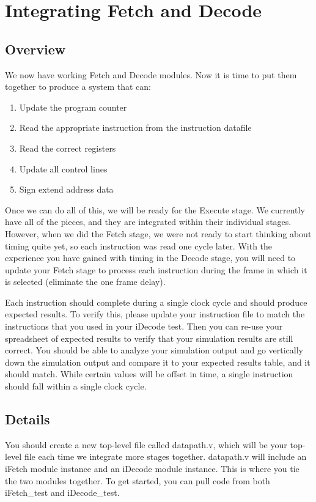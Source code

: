 \chapter{Integrating Fetch and Decode}

\section{Overview}
We now have working Fetch and Decode modules.  Now it is time to put them together to produce a system that can:
\begin{enumerate}
	\item Update the program counter
	\item Read the appropriate instruction from the instruction datafile
	\item Read the correct registers
	\item Update all control lines
	\item Sign extend address data
\end{enumerate}

Once we can do all of this, we will be ready for the Execute stage.  We currently have all of the pieces, and they are integrated within their individual stages.  However, when we did the Fetch stage, we were not ready to start thinking about timing quite yet, so each instruction was read one cycle later.  With the experience you have gained with timing in the Decode stage, you will need to update your Fetch stage to process each instruction during the frame in which it is selected (eliminate the one frame delay).  

Each instruction should complete during a single clock cycle and should produce expected results.  To verify this, please update your instruction file to match the instructions that you used in your iDecode test.  Then you can re-use your spreadsheet of expected results to verify that your simulation results are still correct.  You should be able to analyze your simulation output and go vertically down the simulation output and compare it to your expected results table, and it should match.  While certain values will be offset in time, a single instruction should fall within a single clock cycle.  

\section{Details}
You should create a new top-level file called datapath.v, which will be your top-level file each time we integrate more stages together.  datapath.v will include an iFetch module instance and an iDecode module instance.  This is where you tie the two modules together.  To get started, you can pull code from both iFetch\_test and iDecode\_test.

